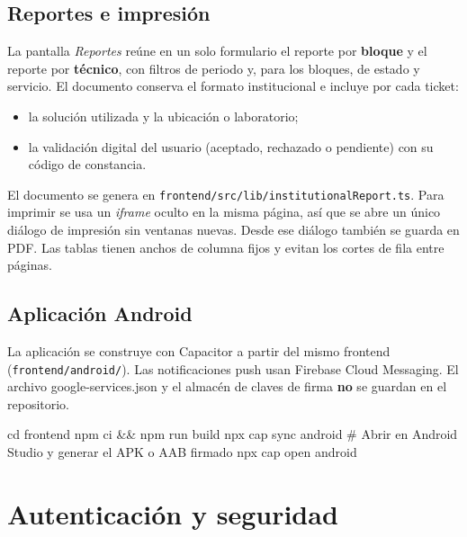 \documentclass[11pt,a4paper,oneside]{report}
\newcommand{\codus}{\textunderscore\allowbreak}
\DeclareRobustCommand{\cod}[1]{{\small\ttfamily\let\_\codus #1}}
\DeclareRobustCommand{\ruta}[1]{{\small\nolinkurl{#1}}}
\begin{document}
\section{Reportes e impresión}
La pantalla \emph{Reportes} reúne en un solo formulario el reporte por \textbf{bloque} y el
reporte por \textbf{técnico}, con filtros de periodo y, para los bloques, de estado y servicio.
El documento conserva el formato institucional e incluye por cada ticket:
\begin{itemize}
  \item la solución utilizada y la ubicación o laboratorio;
  \item la validación digital del usuario (aceptado, rechazado o pendiente) con su código de constancia.
\end{itemize}

El documento se genera en \ruta{frontend/src/lib/institutionalReport.ts}. Para imprimir se usa un
\emph{iframe} oculto en la misma página, así que se abre un único diálogo de impresión sin ventanas
nuevas. Desde ese diálogo también se guarda en PDF. Las tablas tienen anchos de columna fijos y
evitan los cortes de fila entre páginas.

\section{Aplicación Android}
La aplicación se construye con Capacitor a partir del mismo frontend
(\ruta{frontend/android/}). Las notificaciones push usan Firebase Cloud Messaging. El archivo
\cod{google-services.json} y el almacén de claves de firma \textbf{no} se guardan en el repositorio.

\begin{bash}
cd frontend
npm ci && npm run build
npx cap sync android
# Abrir en Android Studio y generar el APK o AAB firmado
npx cap open android
\end{bash}

\chapter{Autenticación y seguridad}\label{cap:seguridad}
\end{document}
